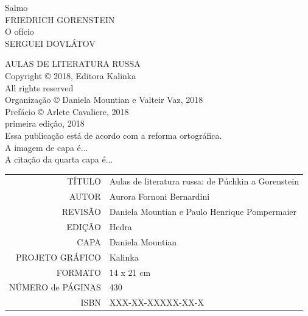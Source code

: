 \noindent{}Salmo\\
FRIEDRICH GORENSTEIN\\

\noindent{}O ofício\\
SERGUEI DOVLÁTOV\\

\newpage
\pagestyle{empty}
\MyriadPro
\scriptsize
\begin{center}
AULAS DE LITERATURA RUSSA\\[6pt]

Copyright © 2018, Editora Kalinka\\[6pt]

All rights reserved\\[20pt]

Organização © Daniela Mountian e Valteir Vaz, 2018\\[6pt]

Prefácio © Arlete Cavaliere, 2018\\[6pt]

primeira edição, 2018\\[40pt]


Essa publicação está de acordo com a reforma ortográfica.\\[6pt]
A imagem de capa é...\\[6pt]	
A citação da quarta capa é...\\[20pt] 
\end{center}


\bigskip

\begin{vplace}[1]
\begin{table}[ht!]
\MyriadPro
\scriptsize
\begin{tabular}{rl}
TÍTULO            & Aulas de literatura russa: de Púchkin a Gorenstein \\[2pt]
AUTOR             & Aurora Fornoni Bernardini                          \\[2pt]
REVISÃO           & Daniela Mountian e Paulo Henrique Pompermaier      \\[2pt]
EDIÇÃO            & Hedra                                              \\[2pt]
CAPA              & Daniela Mountian                                   \\[2pt]
PROJETO GRÁFICO   & Kalinka                                            \\[2pt]
FORMATO           & 14 x 21 cm                                         \\[2pt]
NÚMERO de PÁGINAS & 430                                                \\[2pt]
ISBN              & XXX-XX-XXXXX-XX-X                                 
\end{tabular}
\end{table}
\end{vplace}

